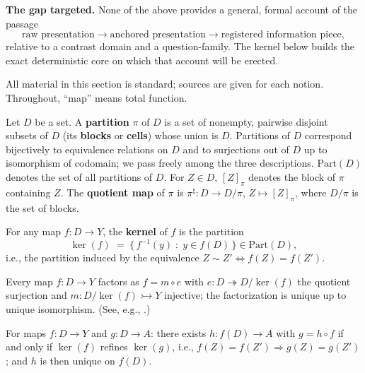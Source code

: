 \textbf{The gap targeted.} None of the above provides a general, formal account of the passage
\[
\text{raw presentation} \to \text{anchored presentation} \to \text{registered information piece},
\]
relative to a contrast domain and a question-family. The kernel below builds the exact deterministic core on which that account will be erected.


All material in this section is standard; sources are given for each notion. Throughout, ``map'' means total function.


Let \(D\) be a set. A \textbf{partition} \(\pi\) of \(D\) is a set of nonempty, pairwise disjoint subsets of \(D\) (its \textbf{blocks} or \textbf{cells}) whose union is \(D\). Partitions of \(D\) correspond bijectively to equivalence relations on \(D\) and to surjections out of \(D\) up to isomorphism of codomain; we pass freely among the three descriptions. \(\mathrm{Part}(D)\) denotes the set of all partitions of \(D\). For \(Z \in D\), \([Z]_\pi\) denotes the block of \(\pi\) containing \(Z\). The \textbf{quotient map} of \(\pi\) is \(\pi^\natural : D \to D/\pi\), \(Z \mapsto [Z]_\pi\), where \(D/\pi\) is the set of blocks.

For any map \(f : D \to Y\), the \textbf{kernel} of \(f\) is the partition
\[
\ker(f) \;=\; \{\, f^{-1}(y) \;:\; y \in f(D) \,\} \in \mathrm{Part}(D),
\]
i.e., the partition induced by the equivalence \(Z \sim Z' \iff f(Z) = f(Z')\).

\begin{thmplain}

Every map \(f : D \to Y\) factors as \(f = m \circ e\) with \(e : D \twoheadrightarrow D/\ker(f)\) the quotient surjection and \(m : D/\ker(f) \rightarrowtail Y\) injective; the factorization is unique up to unique isomorphism. (See, e.g., \autocite{davey2002}.)
\end{thmplain}

\begin{thmplain}

For maps \(f : D \to Y\) and \(g : D \to A\): there exists \(h : f(D) \to A\) with \(g = h \circ f\) if and only if \(\ker(f)\) refines \(\ker(g)\), i.e., \(f(Z) = f(Z') \Rightarrow g(Z) = g(Z')\); and \(h\) is then unique on \(f(D)\).
\end{thmplain}

